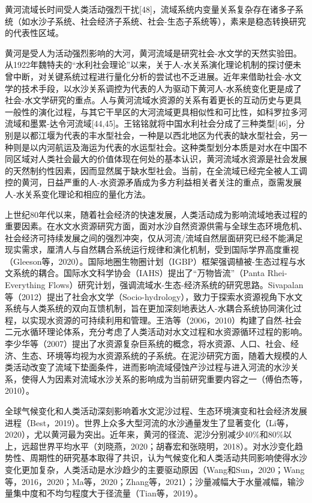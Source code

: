 黄河流域长时间受人类活动强烈干扰[48]，流域系统内变量关系复杂存在诸多子系统（如水沙子系统、社会经济子系统、社会-生态子系统等），素来是稳态转换研究的代表性区域。

黄河是受人为活动强烈影响的大河，黄河流域是研究社会-水文学的天然实验田。从1922年魏特夫的“水利社会理论”以来，关于人-水关系演化理论机制的探讨便未曾中断，对关键系统过程进行量化分析的尝试也不乏进展。近年来借助社会-水文学的技术手段，以水沙关系调控为代表的人为驱动下黄河人-水系统变化更是成了社会-水文学研究的重点。人与黄河流域水资源的关系有着更长的互动历史与更具一般性的演化过程，与其它干旱区的大河流域更具相似性和可比性，如科罗拉多河流域和墨累-达令河流域[44,45]。王铭铭就将中国水利社会分成了三种类型[46]，分别是以都江堰为代表的丰水型社会，一种是以西北地区为代表的缺水型社会，另一种则是以内河航运及海运为代表的水运型社会。这种类型划分本质是对水在中国不同区域对人类社会最大的价值体现在何处的基本认识，黄河流域水资源是社会发展的天然制约性因素，因而显然属于缺水型社会。当前，在全流域已经完全被人工调控的黄河，日益严重的人-水资源矛盾成为多方利益相关者关注的重点，亟需发展人-水关系变化理论和相应的量化方法。

上世纪80年代以来，随着社会经济的快速发展，人类活动成为影响流域地表过程的重要因素。在水文水资源研究方面，面对水沙自然资源供需与全球生态环境危机、社会经济可持续发展之间的强烈冲突，仅从河流/流域自然层面研究已经不能满足现实需求，厘清人与自然耦合系统运行规律和演化机制，受到国际学界高度重视（Gleeson等，2020）。国际地圈生物圈计划（IGBP）框架强调植被-生态过程与水文系统的耦合。国际水文科学协会（IAHS）提出了“万物皆流”（Panta Rhei-Everything Flows）研究计划，强调流域水-生态-经济系统的研究思路。Sivapalan等（2012）提出了社会水文学（Socio-hydrology），致力于探索水资源视角下水文系统与人类系统的双向互馈机制，旨在更加深刻地表达人-水耦合系统协同演化过程，以实现水资源的可持续利用和管理。王浩等（2006，2010）构建了自然-社会二元水循环理论体系，充分考虑了人类活动对水文过程和水资源循环过程的影响。李少华等（2007）提出了水资源复杂巨系统的概念，将水资源、人口、社会、经济、生态、环境等均视为水资源系统的子系统。在泥沙研究方面，随着大规模的人类活动改变了流域下垫面条件，进而影响流域侵蚀产沙过程与进入河流的水沙关系，使得人为因素对流域水沙关系的影响成为当前研究重要内容之一（傅伯杰等，2010）。

全球气候变化和人类活动深刻影响着水文泥沙过程、生态环境演变和社会经济发展进程（Best，2019）。世界上众多大型河流的水沙通量发生了显著变化（Li等，2020），尤以黄河最为突出。近年来，黄河的径流、泥沙分别减少40\%和80\%以上，远超世界平均水平（刘晓燕，2020；胡春宏和张晓明，2018）。对水沙变化趋势性、周期性的研究基本取得了共识，认为气候变化和人类活动共同影响使得水沙变化更加复杂，人类活动是水沙趋少的主要驱动原因（Wang和Sun，2020；Wang等，2016，2020；Ma等，2020；Zhang等，2021）；沙量减幅大于水量减幅，输沙量集中度和不均匀程度大于径流量（Tian等，2019）。


